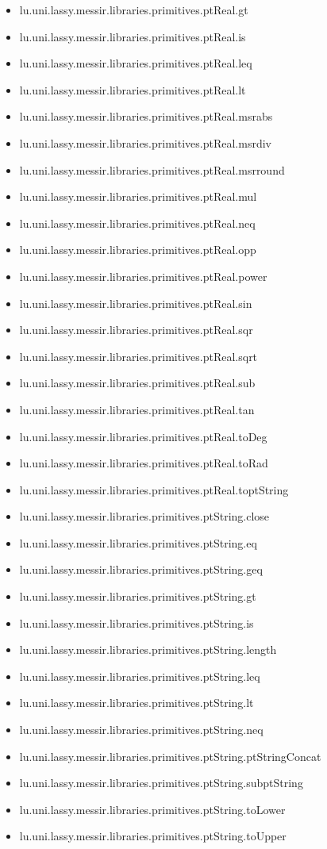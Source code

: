 \begin{itemize}
\item lu.uni.lassy.messir.libraries.primitives.ptReal.gt 
\item lu.uni.lassy.messir.libraries.primitives.ptReal.is 
\item lu.uni.lassy.messir.libraries.primitives.ptReal.leq 
\item lu.uni.lassy.messir.libraries.primitives.ptReal.lt 
\item lu.uni.lassy.messir.libraries.primitives.ptReal.msrabs 
\item lu.uni.lassy.messir.libraries.primitives.ptReal.msrdiv 
\item lu.uni.lassy.messir.libraries.primitives.ptReal.msrround 
\item lu.uni.lassy.messir.libraries.primitives.ptReal.mul 
\item lu.uni.lassy.messir.libraries.primitives.ptReal.neq 
\item lu.uni.lassy.messir.libraries.primitives.ptReal.opp 
\item lu.uni.lassy.messir.libraries.primitives.ptReal.power 
\item lu.uni.lassy.messir.libraries.primitives.ptReal.sin 
\item lu.uni.lassy.messir.libraries.primitives.ptReal.sqr 
\item lu.uni.lassy.messir.libraries.primitives.ptReal.sqrt 
\item lu.uni.lassy.messir.libraries.primitives.ptReal.sub 
\item lu.uni.lassy.messir.libraries.primitives.ptReal.tan 
\item lu.uni.lassy.messir.libraries.primitives.ptReal.toDeg 
\item lu.uni.lassy.messir.libraries.primitives.ptReal.toRad 
\item lu.uni.lassy.messir.libraries.primitives.ptReal.toptString 
\item lu.uni.lassy.messir.libraries.primitives.ptString.close 
\item lu.uni.lassy.messir.libraries.primitives.ptString.eq 
\item lu.uni.lassy.messir.libraries.primitives.ptString.geq 
\item lu.uni.lassy.messir.libraries.primitives.ptString.gt 
\item lu.uni.lassy.messir.libraries.primitives.ptString.is 
\item lu.uni.lassy.messir.libraries.primitives.ptString.length 
\item lu.uni.lassy.messir.libraries.primitives.ptString.leq 
\item lu.uni.lassy.messir.libraries.primitives.ptString.lt 
\item lu.uni.lassy.messir.libraries.primitives.ptString.neq 
\item lu.uni.lassy.messir.libraries.primitives.ptString.ptStringConcat 
\item lu.uni.lassy.messir.libraries.primitives.ptString.subptString 
\item lu.uni.lassy.messir.libraries.primitives.ptString.toLower 
\item lu.uni.lassy.messir.libraries.primitives.ptString.toUpper 
\end{itemize}








